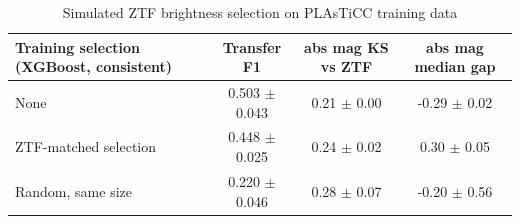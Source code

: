 \begin{table}
\centering
\caption{Simulated ZTF brightness selection on PLAsTiCC training data}
\begin{tabular}{lccc}
\hline
Training selection (XGBoost, consistent) & Transfer F1 & abs mag KS vs ZTF & abs mag median gap \\
\hline
None & 0.503 $\pm$ 0.043 & 0.21 $\pm$ 0.00 & -0.29 $\pm$ 0.02 \\
ZTF-matched selection & 0.448 $\pm$ 0.025 & 0.24 $\pm$ 0.02 & 0.30 $\pm$ 0.05 \\
Random, same size & 0.220 $\pm$ 0.046 & 0.28 $\pm$ 0.07 & -0.20 $\pm$ 0.56 \\
\hline
\end{tabular}
\end{table}
